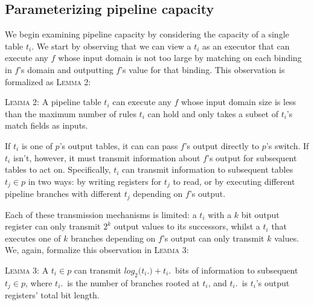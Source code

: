\subsection{Parameterizing pipeline capacity}
\label{subsec:pipeline-capacity}



 We begin examining pipeline capacity by considering the capacity of a single table $t_i$. We start by observing that we can view a $t_i$ as an executor that can execute any $f$ whose input domain is not too large by matching on each binding in $f$'s domain and outputting $f$'s value for that binding. This observation is formalized as \textsc{Lemma 2}:
\vspace{2mm}

\noindent \textsc{Lemma 2:} A pipeline table $t_i$ can execute any $f$ whose input domain size is less than the maximum number of rules $t_i$ can hold and only takes a subset of $t_i$'s match fields as inputs.
\vspace{2mm}


If $t_i$ is one of $p$'s output tables, it can can pass $f$'s output directly to $p$'s switch. If $t_i$ isn't, however, it must transmit information about $f$'s output for subsequent tables to act on. Specifically, $t_i$ can transmit information to subsequent tables $t_j \in p$ in two ways: by writing registers for $t_j$ to read, or by executing different pipeline branches with different $t_j$ depending on $f$'s output.


Each of these transmission mechanisms is limited: a $t_i$ with a $k$ bit output register can only transmit $2^k$ output values to its successors, whilst a $t_i$ that executes one of $k$ branches depending on $f$'s output can only transmit $k$ values. We, again, formalize this observation in \textsc{Lemma 3}:
\vspace{2mm}

\noindent \textsc{Lemma 3:} A $t_i \in p$ can transmit $log_2(t_i.$\branches$) + t_i.$\registerbits\ bits of information to subsequent $t_j \in p$,  where  $t_i.$\branches\ is the number of branches rooted at $t_i$, and $t_i.$\registerbits\ is $t_i$'s output registers' total bit length.
\vspace{2mm}

